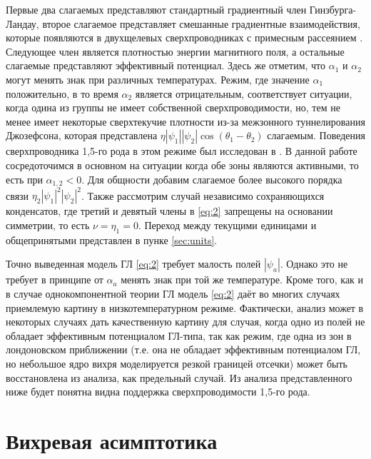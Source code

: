 Первые два слагаемых представляют стандартный градиентный член 
Гинзбурга-Ландау, второе слагаемое представляет смешанные градиентные 
взаимодействия, которые появляются в двухщелевых сверхпроводниках с примесным 
рассеянием \cite{bib:8,bib:9}. Следующее член является плотностью энергии 
магнитного поля, а остальные слагаемые представляют эффективный потенциал. 
Здесь же отметим, что \( \alpha_1 \) и \( \alpha_2 \) могут менять знак 
при различных температурах. Режим, где значение \( \alpha_1 \) положительно, 
в то время \( \alpha_2 \) является отрицательным, соответствует ситуации, 
когда одина из группы не имеет собственной сверхпроводимости, но, тем не менее 
имеет некоторые сверхтекучие плотности из-за межзонного туннелирования 
Джозефсона, которая представлена 
\( \eta|\psi_1||\psi_2|\cos(\theta_1-\theta_2) \) слагаемым. Поведения 
сверхпроводника 1,5-го рода в этом режиме был исследован в \cite{bib:2}. В 
данной работе сосредоточимся в основном на ситуации когда обе зоны являются 
активными, то есть при \( \alpha_{1,2} < 0 \). Для общности добавим слагаемое 
более высокого порядка связи \( \eta_2|\psi_1|^2|\psi_2|^2 \). Также 
рассмотрим случай независимо сохраняющихся конденсатов, где третий и девятый 
члены в \eqref{eq:2} запрещены на основании симметрии, то есть 
\( \nu = \eta_1 = 0 \). Переход между текущими единицами и общепринятыми 
представлен в пунке \ref{sec:units}.

Точно выведенная модель ГЛ \eqref{eq:2} требует малость полей \( |\psi_a| \). 
Однако это не требует в принципе от \( \alpha_a \) менять знак при той же 
температуре. Кроме того, как и в случае однокомпонентной теории ГЛ модель 
\eqref{eq:2} даёт во многих случаях приемлемую картину в низкотемпературном 
режиме. Фактически, анализ может в некоторых случаях дать качественную картину 
для случая, когда одно из полей не обладает эффективным потенциалом ГЛ-типа, 
так как режим, где одна из зон в лондоновском приближении (т.е. она не 
обладает эффективным потенциалом ГЛ, но небольшое ядро вихря моделируется 
резкой границей отсечки) может быть восстановлена из анализа, как предельный 
случай. Из анализа представленного ниже будет понятна видна поддержка 
сверхпроводимости 1,5-го рода.

\section{Вихревая асимптотика}

